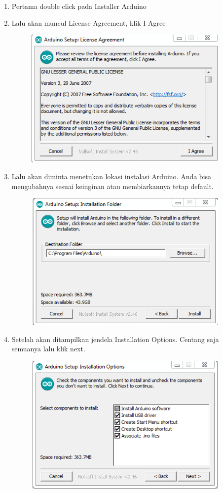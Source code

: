 \begin{enumerate}
    \item Pertama double click pada Installer Arduino
    \item Lalu akan muncul License Agreement, klik I Agree
    \begin{figure}[H]
		\includegraphics[width=10cm]{figures/5/1174071/Teori/1.png}
		\centering
	\end{figure}
    \item Lalu akan diminta menetukan lokasi instalasi Arduino.
    Anda bisa mengubahnya sesuai keinginan atau membiarkannya tetap default.
    \begin{figure}[H]
		\includegraphics[width=10cm]{figures/5/1174071/Teori/2.png}
		\centering
	\end{figure}
    \item Setelah akan ditampilkan jendela Installation Options. Centang saja semuanya lalu klik next.
    \begin{figure}[H]
		\includegraphics[width=10cm]{figures/5/1174071/Teori/3.png}

\end{figure}
\end{enumerate}
